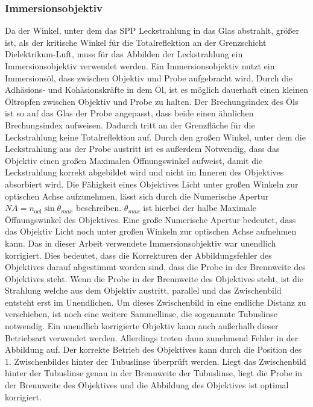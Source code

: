 \documentclass{article}
\begin{document}
	\subsubsection{Immersionsobjektiv}
	Da der Winkel, unter dem das SPP Leckstrahlung in das Glas abstrahlt, größer ist, als der kritische Winkel für die Totalreflektion an der Grenzschicht Dielektrikum-Luft, muss für das Abbilden der Leckstrahlung ein Immersionsobjektiv verwendet werden. Ein Immersionsobjektiv nutzt ein Immersionsöl, dass zwischen Objektiv und Probe aufgebracht wird. Durch die Adhäsions- und Kohäsionskräfte in dem Öl, ist es möglich dauerhaft einen kleinen Öltropfen zwischen Objektiv und Probe zu halten. Der Brechungsindex des Öls ist so auf das Glas der Probe angepasst, dass beide einen ähnlichen Brechungsindex aufweisen. Dadurch tritt an der Grenzfläche für die Leckstrahlung keine Totalreflektion auf. Durch den großen Winkel, unter dem die Leckstrahlung aus der Probe austritt ist es außerdem Notwendig, dass das Objektiv einen großen Maximalen Öffnungswinkel aufweist, damit die Leckstrahlung korrekt abgebildet wird und nicht im Inneren des Objektives absorbiert wird. Die Fähigkeit eines Objektives Licht unter großen Winkeln zur optischen Achse aufzunehmen, lässt sich durch die Numerische Apertur $NA = n_{\mathrm{oel}}\sin\theta_{max}$ beschreiben. $\theta_{max}$ ist hierbei der halbe Maximale Öffnungswinkel des Objektives. Eine große Numerische Apertur bedeutet, dass das Objektiv Licht noch unter großen Winkeln zur optischen Achse aufnehmen kann. Das in dieser Arbeit verwendete Immersionsobjektiv war unendlich korrigiert. Dies bedeutet, dass die Korrekturen der Abbildungsfehler des Objektives darauf abgestimmt worden sind, dass die Probe in der Brennweite des Objektives steht. Wenn die Probe in der Brennweite des Objektives steht, ist die Strahlung welche aus dem Objektiv austritt, parallel und das Zwischenbild entsteht erst im Unendlichen. Um dieses Zwischenbild in eine endliche Distanz zu verschieben, ist noch eine weitere Sammellinse, die sogenannte Tubuslinse notwendig. Ein unendlich korrigierte Objektiv kann auch außerhalb dieser Betriebsart verwendet werden. Allerdings treten dann zunehmend Fehler in der Abbildung auf. Der korrekte Betrieb des Objektives kann durch die Position des  1. Zwischenbildes hinter der Tubuslinse überprüft werden. Liegt das Zwischenbild hinter der Tubuslinse genau in der Brennweite der Tubuslinse, liegt die Probe in der Brennweite des Objektives und die Abbildung des Objektives ist optimal korrigiert.\cite{Kuhl.2018}
\end{document}
